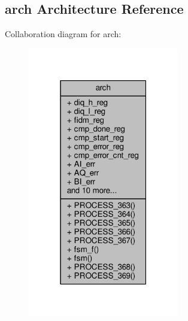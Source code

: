 \subsection{arch Architecture Reference}
\label{classsmpl__cmp_1_1arch}


Collaboration diagram for arch\+:\nopagebreak
\begin{figure}[H]
\begin{center}
\leavevmode
\includegraphics[width=187pt]{da/d5f/classsmpl__cmp_1_1arch__coll__graph}
\end{center}
\end{figure}
